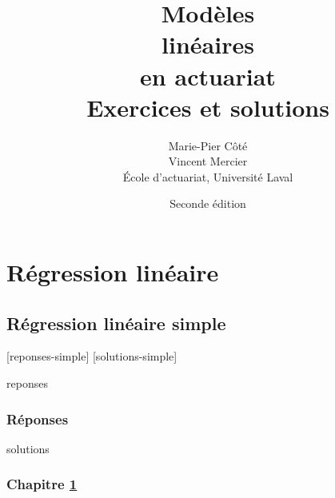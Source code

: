 \documentclass[letterpaper,10pt]{memoir}\usepackage[]{graphicx}\usepackage[]{color}
\title{\HUGE
    \fontseries{ub}\selectfont Modèles \\
    \fontseries{ub}\selectfont linéaires\\
    \fontseries{ub}\selectfont en actuariat \\[0.5\baselineskip]
    \huge\fontseries{m}\selectfont Exercices et solutions}
\author{\LARGE Marie-Pier Côté \\[3mm]
          \LARGE Vincent Mercier \\[3mm]
    \large École d'actuariat, Université Laval}
\date{\large Seconde édition}
\begin{document}

\frontmatter

\pagestyle{empty}


\pagestyle{companion}



\cleardoublepage
\tableofcontents*

\mainmatter

\part{Régression linéaire}



\chapter{Régression linéaire simple}
\label{chap:simple}

[reponses-simple]
[solutions-simple]

\begin{Filesave}{reponses}
\bigskip
\section*{Réponses}

\end{Filesave}

\begin{Filesave}{solutions}
\section*{Chapitre \ref{chap:simple}}

\end{Filesave}
\end{document}
